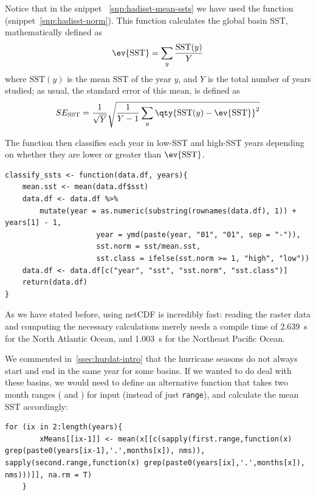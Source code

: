 Notice that in the snippet ~\ref{snp:hadisst-mean-ssts} we have used the function  (snippet~\ref{snp:hadisst-norm}). This function calculates the global basin SST, mathematically defined as
\begin{align}
	\ev{\text{SST}} = \sum_{y} \frac{\text{SST}(y)}{Y}
\end{align}
where $\text{SST}(y)$ is the mean SST of the year $y$, and $Y$ is the total number of years studied; as usual, the standard error of this mean, is defined as
\begin{align}\label{eq:sst-sem}
	SE_{\text{SST}} = \frac{1}{\sqrt{Y}} \sqrt{ \frac{1}{Y-1} \sum_{y} \qty{\text{SST}(y) - \ev{\text{SST}}}^{2} }
\end{align}

The function then classifies each year in low-SST and high-SST years depending on whether they are lower or greater than $\ev{\text{SST}}$.

\begin{lstlisting}[caption=Function to normalise the SSTs and classify years in low or high SST, label=snp:hadisst-norm]
classify_ssts <- function(data.df, years){
	mean.sst <- mean(data.df$sst)
	data.df <- data.df %>%
		mutate(year = as.numeric(substring(rownames(data.df), 1)) + years[1] - 1,
					 year = ymd(paste(year, "01", "01", sep = "-")),
					 sst.norm = sst/mean.sst,
					 sst.class = ifelse(sst.norm >= 1, "high", "low"))
	data.df <- data.df[c("year", "sst", "sst.norm", "sst.class")]
	return(data.df)
}
\end{lstlisting}

As we have stated before, using netCDF is incredibly fast: reading the raster data and computing the necessary calculations merely needs a compile time of \SI{2.639}{s} for the North Atlantic Ocean, and \SI{1.003}{s} for the Northeast Pacific Ocean.

\sk
We commented in~\cref{ssec:hurdat-intro} that the hurricane seasons do not always start and end in the same year for some basins. If we wanted to do deal with these basins, we would need to define an alternative  function that takes two month ranges ( and ) for input (instead of just \texttt{range}), and calculate the mean SST accordingly:
\begin{lstlisting}[caption=Loop to calculate the mean SST in seasons not contained in the same year, label=snp:hadisst-mean-ssts-alt, firstnumber=10]
	for (ix in 2:length(years){
		xMeans[[ix-1]] <- mean(x[[c(sapply(first.range,function(x) grep(paste0(years[ix-1],'.',months[x]), nms)), sapply(second.range,function(x) grep(paste0(years[ix],'.',months[x]), nms)))]], na.rm = T)
	}
\end{lstlisting}

